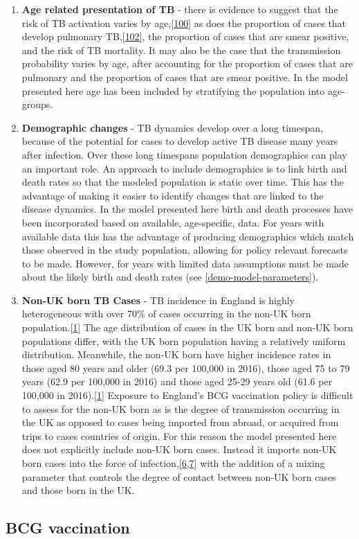 \documentclass[11pt,twoside]{bristolthesis}
\begin{document}
\begin{enumerate}
  \item
    \textbf{Age related presentation of TB} - there is evidence to suggest that the risk of TB activation varies by age,{[}\protect\hyperlink{ref-Ragonnet2017}{100}{]} as does the proportion of cases that develop pulmonary TB,{[}\protect\hyperlink{ref-Lefebvre2017}{102}{]}, the proportion of cases that are smear positive, and the risk of TB mortality. It may also be the case that the transmission probability varies by age, after accounting for the proportion of cases that are pulmonary and the proportion of cases that are smear positive. In the model presented here age has been included by stratifying the population into age-groups.
  \item
    \textbf{Demographic changes} - TB dynamics develop over a long timespan, because of the potential for cases to develop active TB disease many years after infection. Over these long timespans population demographics can play an important role. An approach to include demographics is to link birth and death rates so that the modeled population is static over time. This has the advantage of making it easier to identify changes that are linked to the disease dynamics. In the model presented here birth and death processes have been incorporated based on available, age-specific, data. For years with available data this has the advantage of producing demographics which match those observed in the study population, allowing for policy relevant forecasts to be made. However, for years with limited data assumptions must be made about the likely birth and death rates (see \ref{demo-model-parameters}).
  \item
    \textbf{Non-UK born TB Cases} - TB incidence in England is highly heterogeneous with over 70\% of cases occurring in the non-UK born population.{[}\protect\hyperlink{ref-PHE2017}{1}{]} The age distribution of cases in the UK born and non-UK born populations differ, with the UK born population having a relatively uniform distribution. Meanwhile, the non-UK born have higher incidence rates in those aged 80 years and older (69.3 per 100,000 in 2016), those aged 75 to 79 years (62.9 per 100,000 in 2016) and those aged 25-29 years old (61.6 per 100,000 in 2016).{[}\protect\hyperlink{ref-PHE2017}{1}{]} Exposure to England's BCG vaccination policy is difficult to assess for the non-UK born as is the degree of transmission occurring in the UK as opposed to cases being imported from abroad, or acquired from trips to cases countries of origin. For this reason the model presented here does not explicitly include non-UK born cases. Instead it imports non-UK born cases into the force of infection,{[}\protect\hyperlink{ref-Anderson1991}{6},\protect\hyperlink{ref-Keeling2007}{7}{]} with the addition of a mixing parameter that controls the degree of contact between non-UK born cases and those born in the UK.
  \end{enumerate}
  \hypertarget{bcg-vaccination}{%
  \subsection{BCG vaccination}\label{bcg-vaccination}}
  
\end{document}
